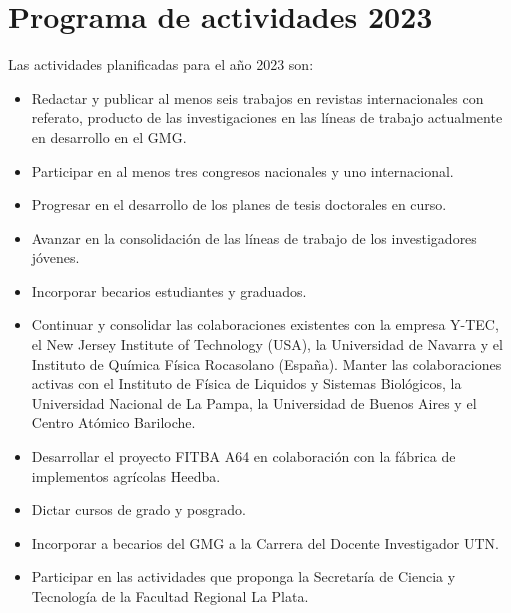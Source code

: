 \documentclass[a4paper,11pt,twoside,final,titlepage,onecolumn,openright]{report}
\begin{document}
\chapter{Programa de actividades 2023}

Las actividades planificadas para el año 2023 son:

\begin{itemize}
\item  Redactar y publicar al menos seis trabajos en revistas internacionales con referato, producto de las investigaciones en las líneas de trabajo actualmente en desarrollo en el GMG.
\item  Participar en al menos tres congresos nacionales y uno internacional. 
\item  Progresar en el desarrollo de los planes de tesis doctorales en curso.
\item  Avanzar en la consolidación de las líneas de trabajo de los investigadores jóvenes. 
\item  Incorporar becarios estudiantes y graduados. 
\item  Continuar y consolidar las colaboraciones existentes con la empresa Y-TEC, el New Jersey Institute of Technology (USA), la Universidad de Navarra y el Instituto de Química Física Rocasolano (España). Manter las colaboraciones activas con el Instituto de Física de Liquidos y Sistemas Biológicos, la Universidad Nacional de La Pampa, la Universidad de Buenos Aires y el Centro Atómico Bariloche.
\item Desarrollar el proyecto FITBA A64 en colaboración con la fábrica de implementos agrícolas Heedba.
\item  Dictar cursos de grado y posgrado.
\item  Incorporar a becarios del GMG a la Carrera del Docente Investigador UTN.
\item  Participar en las actividades que proponga la Secretaría de Ciencia y Tecnología de la Facultad Regional La Plata.
\end{itemize}
\end{document}
